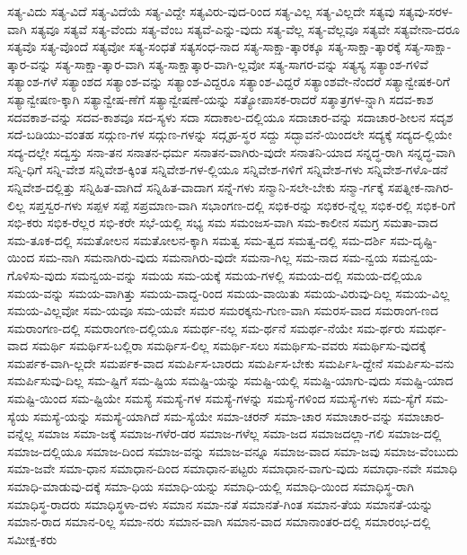 {ಸತ್ಯ-ವಿದು
ಸತ್ಯ-ವಿದೆ
ಸತ್ಯ-ವಿದೆಯೆ
ಸತ್ಯ-ವಿದ್ದೇ
ಸತ್ಯವಿರು-ವುದ-ರಿಂದ
ಸತ್ಯ-ವಿಲ್ಲ
ಸತ್ಯ-ವಿಲ್ಲದೇ
ಸತ್ಯವು
ಸತ್ಯವು-ಸರಳ-ವಾಗಿ
ಸತ್ಯವೂ
ಸತ್ಯವೆ
ಸತ್ಯ-ವೆಂದು
ಸತ್ಯ-ವೆಂಬ
ಸತ್ಯವೆ-ಎನ್ನು-ವುದು
ಸತ್ಯ-ವೆಲ್ಲ
ಸತ್ಯ-ವೆಲ್ಲವೂ
ಸತ್ಯವೇ
ಸತ್ಯವೇನಾ-ದರೂ
ಸತ್ಯವೊ
ಸತ್ಯ-ವೊಂದೆ
ಸತ್ಯವೋ
ಸತ್ಯ-ಸಂಧತೆ
ಸತ್ಯಸಂಧ-ನಾದ
ಸತ್ಯ-ಸಾಕ್ಷಾ-ತ್ಕಾರಕ್ಕೂ
ಸತ್ಯ-ಸಾಕ್ಷಾ-ತ್ಕಾರಕ್ಕೆ
ಸತ್ಯ-ಸಾಕ್ಷಾ-ತ್ಕಾರ-ವನ್ನು
ಸತ್ಯ-ಸಾಕ್ಷಾ-ತ್ಕಾರ-ವಾಗಿ
ಸತ್ಯ-ಸಾಕ್ಷಾತ್ಕಾರ-ವಾಗಿ-ಲ್ಲವೋ
ಸತ್ಯ-ಸಾಗರ-ವನ್ನು
ಸತ್ಯಸ್ಯ
ಸತ್ಯಾಂಶ-ಗಳಿವೆ
ಸತ್ಯಾಂಶ-ಗಳೆ
ಸತ್ಯಾಂಶದ
ಸತ್ಯಾಂಶ-ವನ್ನು
ಸತ್ಯಾಂಶ-ವಿದ್ದರೂ
ಸತ್ಯಾಂಶ-ವಿದ್ದರೆ
ಸತ್ಯಾಂಶವೇ-ನೆಂದರೆ
ಸತ್ಯಾನ್ವೇಷಕ-ರಿಗೆ
ಸತ್ಯಾನ್ವೇಷಣ-ಕ್ಕಾಗಿ
ಸತ್ಯಾನ್ವೇಷ-ಣೆಗೆ
ಸತ್ಯಾನ್ವೇಷಣೆ-ಯನ್ನು
ಸತ್ಯೋಪಾಸಕ-ರಾದರೆ
ಸತ್ಶಾತ್ರಗಳ-ನ್ನಾಗಿ
ಸದವ-ಕಾಶ
ಸದವಕಾಶ-ವನ್ನು
ಸದವ-ಕಾಶವೂ
ಸದ-ಸ್ಯಳು
ಸದಾ
ಸದಾಕಾಲ-ದಲ್ಲಿಯೂ
ಸದಾಚಾರ-ವನ್ನು
ಸದಾಚಾರ-ಶೀಲನ
ಸದೃಶ
ಸದೆ-ಬಡಿಯು-ವಂತಹ
ಸದ್ಗುಣ-ಗಳ
ಸದ್ಗುಣ-ಗಳನ್ನು
ಸದ್ಗೃಹ-ಸ್ಥರ
ಸದ್ದು
ಸದ್ಭಾವನೆ-ಯಿಂದಲೇ
ಸದ್ಯಕ್ಕೆ
ಸದ್ಯದ-ಲ್ಲಿಯೇ
ಸದ್ಯ-ದಲ್ಲೇ
ಸದ್ವಸ್ತು
ಸನಾ-ತನ
ಸನಾತನ-ಧರ್ಮ
ಸನಾತನ-ವಾಗಿರು-ವುದೇ
ಸನಾತನಿ-ಯಾದ
ಸನ್ನದ್ಧ-ರಾಗಿ
ಸನ್ನದ್ಧ-ವಾಗಿ
ಸನ್ನಿ-ಧಿಗೆ
ಸನ್ನಿ-ವೇಶ
ಸನ್ನಿವೇಶ-ಕ್ಕಿಂತ
ಸನ್ನಿವೇಶ-ಗಳ-ಲ್ಲಿಯೂ
ಸನ್ನಿವೇಶ-ಗಳಿಗೆ
ಸನ್ನಿವೇಶ-ಗಳು
ಸನ್ನಿವೇಶ-ಗಳೊ-ಡನೆ
ಸನ್ನಿವೇಶ-ದಲ್ಲಿತ್ತು
ಸನ್ನಿಹಿತ-ವಾಗಿದೆ
ಸನ್ನಿಹಿತ-ವಾದಾಗ
ಸನ್ನೆ-ಗಳು
ಸನ್ಮಾನಿ-ಸಲೇ-ಬೇಕು
ಸನ್ಮಾ-ರ್ಗಕ್ಕೆ
ಸಪತ್ನೀಕ-ನಾಗಿರ-ಲಿಲ್ಲ
ಸಪ್ತಸ್ವರ-ಗಳು
ಸಪ್ಪಳ
ಸಪ್ಪೆ
ಸಪ್ರಮಾಣ-ವಾಗಿ
ಸಭಾಂಗಣ-ದಲ್ಲಿ
ಸಭಿಕ-ರನ್ನು
ಸಭಿಕರ-ನ್ನೆಲ್ಲ
ಸಭಿಕ-ರಲ್ಲಿ
ಸಭಿಕ-ರಿಗೆ
ಸಭಿ-ಕರು
ಸಭಿಕ-ರೆಲ್ಲರ
ಸಭಿ-ಕರೇ
ಸಭೆ-ಯಲ್ಲಿ
ಸಭ್ಯ
ಸಮ
ಸಮಂಜಸ-ವಾಗಿ
ಸಮ-ಕಾಲೀನ
ಸಮಗ್ರ
ಸಮತಾ-ವಾದ
ಸಮ-ತೂಕ-ದಲ್ಲಿ
ಸಮತೋಲನ
ಸಮತೋಲನ-ಕ್ಕಾಗಿ
ಸಮತ್ವ
ಸಮ-ತ್ವದ
ಸಮತ್ವ-ದಲ್ಲಿ
ಸಮ-ದರ್ಶಿ
ಸಮ-ದೃಷ್ಟಿ-ಯಿಂದ
ಸಮ-ನಾಗಿ
ಸಮನಾಗಿರು-ವುದು
ಸಮನಾಗಿರು-ವುದೇ
ಸಮನಾ-ಗಿಲ್ಲ
ಸಮ-ನಾದ
ಸಮ-ನ್ವಯ
ಸಮನ್ವಯ-ಗೊಳಿಸು-ವುದು
ಸಮನ್ವಯ-ವನ್ನು
ಸಮಯ
ಸಮ-ಯಕ್ಕೆ
ಸಮಯ-ಗಳಲ್ಲಿ
ಸಮಯ-ದಲ್ಲಿ
ಸಮಯ-ದಲ್ಲಿಯೂ
ಸಮಯ-ವನ್ನು
ಸಮಯ-ವಾಗಿತ್ತು
ಸಮಯ-ವಾದ್ದ-ರಿಂದ
ಸಮಯ-ವಾಯಿತು
ಸಮಯ-ವಿರುವು-ದಿಲ್ಲ
ಸಮಯ-ವಿಲ್ಲ
ಸಮಯ-ವಿಲ್ಲವೋ
ಸಮ-ಯವೂ
ಸಮ-ಯವೇ
ಸಮರ
ಸಮರಕ್ಕನು-ಗುಣ-ವಾಗಿ
ಸಮರಸ-ವಾದ
ಸಮರಾಂಗ-ಣದ
ಸಮರಾಂಗಣ-ದಲ್ಲಿ
ಸಮರಾಂಗಣ-ದಲ್ಲಿಯೂ
ಸಮರ್ಥ-ನಲ್ಲ
ಸಮ-ರ್ಥನೆ
ಸಮರ್ಥ-ನೆಯೇ
ಸಮ-ರ್ಥರು
ಸಮರ್ಥ-ವಾದ
ಸಮರ್ಥಿ
ಸಮರ್ಥಿಸ-ಬಲ್ಲಿರಾ
ಸಮರ್ಥಿಸ-ಲಿಲ್ಲ
ಸಮರ್ಥಿ-ಸಲು
ಸಮರ್ಥಿಸು-ವವರು
ಸಮರ್ಥಿಸು-ವುದಕ್ಕೆ
ಸಮರ್ಪಕ-ವಾಗಿ-ಲ್ಲದೇ
ಸಮರ್ಪಕ-ವಾದ
ಸಮರ್ಪಿಸ-ಬಾರದು
ಸಮರ್ಪಿಸ-ಬೇಕು
ಸಮರ್ಪಿಸಿ-ದ್ದೇನೆ
ಸಮರ್ಪಿಸು-ವನು
ಸಮರ್ಪಿಸುವು-ದಿಲ್ಲ
ಸಮ-ಷ್ಟಿಗೆ
ಸಮ-ಷ್ಟಿಯ
ಸಮಷ್ಟಿ-ಯನ್ನು
ಸಮಷ್ಟಿ-ಯಲ್ಲಿ
ಸಮಷ್ಟಿ-ಯಾಗು-ವುದು
ಸಮಷ್ಟಿ-ಯಾದ
ಸಮಷ್ಟಿ-ಯಿಂದ
ಸಮ-ಷ್ಟಿಯೇ
ಸಮಸ್ಯೆ
ಸಮಸ್ಯೆ-ಗಳ
ಸಮಸ್ಯೆ-ಗಳನ್ನು
ಸಮಸ್ಯೆ-ಗಳಿಂದ
ಸಮಸ್ಯೆ-ಗಳು
ಸಮ-ಸ್ಯೆಗೆ
ಸಮ-ಸ್ಯೆಯ
ಸಮಸ್ಯೆ-ಯನ್ನು
ಸಮಸ್ಯೆ-ಯಾಗಿದೆ
ಸಮ-ಸ್ಯೆಯೇ
ಸಮಾ-ಚರನ್
ಸಮಾ-ಚಾರ
ಸಮಾಚಾರ-ವನ್ನು
ಸಮಾಚಾರ-ವನ್ನೆಲ್ಲ
ಸಮಾಜ
ಸಮಾ-ಜಕ್ಕೆ
ಸಮಾಜ-ಗಳೆರ-ಡರ
ಸಮಾಜ-ಗಳೆಲ್ಲ
ಸಮಾ-ಜದ
ಸಮಾಜದಲ್ಲಾ-ಗಲಿ
ಸಮಾಜ-ದಲ್ಲಿ
ಸಮಾಜ-ದಲ್ಲಿಯೂ
ಸಮಾಜ-ದಿಂದ
ಸಮಾಜ-ವನ್ನು
ಸಮಾಜ-ವನ್ನೂ
ಸಮಾಜ-ವಾದ
ಸಮಾ-ಜವು
ಸಮಾಜ-ವೆಂಬುದು
ಸಮಾ-ಜವೇ
ಸಮಾ-ಧಾನ
ಸಮಾಧಾನ-ದಿಂದ
ಸಮಾಧಾನ-ಪಟ್ಟರು
ಸಮಾಧಾನ-ವಾಗು-ವುದು
ಸಮಾಧಾ-ನವೇ
ಸಮಾಧಿ
ಸಮಾಧಿ-ಮಾಡುವು-ದಕ್ಕೆ
ಸಮಾ-ಧಿಯ
ಸಮಾಧಿ-ಯನ್ನು
ಸಮಾಧಿ-ಯಲ್ಲಿ
ಸಮಾಧಿ-ಯಿಂದ
ಸಮಾಧಿಸ್ಥ-ರಾಗಿ
ಸಮಾಧಿಸ್ಥ-ರಾದರು
ಸಮಾಧಿಸ್ಥಳಾ-ದಳು
ಸಮಾನ
ಸಮಾ-ನತೆ
ಸಮಾನತೆ-ಗಿಂತ
ಸಮಾನ-ತೆಯ
ಸಮಾನತೆ-ಯನ್ನು
ಸಮಾನ-ರಾದ
ಸಮಾನ-ರಿಲ್ಲ
ಸಮಾ-ನರು
ಸಮಾನ-ವಾಗಿ
ಸಮಾನ-ವಾದ
ಸಮಾನಾಂತರ-ದಲ್ಲಿ
ಸಮಾರಂಭ-ದಲ್ಲಿ
ಸಮೀಕ್ಷ-ಕರು
}
